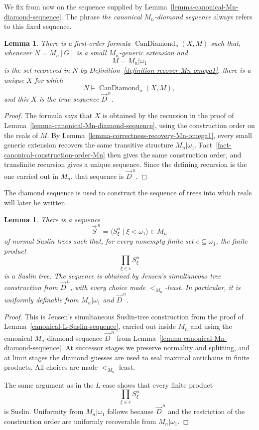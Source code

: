 \documentclass[a4paper,11pt]{article}
\newtheorem{lemma}[theorem]{Lemma}
\begin{document}
We fix from now on the sequence supplied by
Lemma~\ref{lemma-canonical-Mn-diamond-sequence}.  The phrase
\emph{the canonical $M_n$-diamond sequence} always refers to this fixed
sequence.

\begin{lemma}
\label{lemma-uniform-recovery-Mn-diamond}
There is a first-order formula
$\operatorname{CanDiamond}_n(X,M)$ such that, whenever
$N=M_n[G]$ is a small $M_n$-generic extension and
\[
   M=M_n|\omega_1
\]
is the set recovered in $N$ by
Definition~\ref{definition-recover-Mn-omega1}, there is a unique $X$ for
which
\[
   N\models\operatorname{CanDiamond}_n(X,M),
\]
and this $X$ is the true sequence $\vec D^{\,n}$.
\end{lemma}

\begin{proof}
The formula says that $X$ is obtained by the recursion in the proof of
Lemma~\ref{lemma-canonical-Mn-diamond-sequence}, using the construction order
on the reals of $M$.  By
Lemma~\ref{lemma-correctness-recovery-Mn-omega1}, every small generic
extension recovers the same transitive structure
$M_n|\omega_1$.  Fact~\ref{fact-canonical-construction-order-Mn}
then gives the same construction order, and transfinite recursion gives a
unique sequence.  Since the defining recursion is the one carried out in
$M_n$, that sequence is $\vec D^{\,n}$.
\end{proof}

The diamond sequence is used to construct the sequence of trees into which
reals will later be written.

\begin{lemma}
\label{lemma-canonical-independent-Mn-Suslin-sequence}
There is a sequence
\[
   \vec S^{\,n}
   =\langle S^n_\xi\mid\xi<\omega_1\rangle\in M_n
\]
of normal Suslin trees such that, for every nonempty finite set
$e\subseteq\omega_1$, the finite product
\[
   \prod_{\xi\in e}S^n_\xi
\]
is a Suslin tree.  The sequence is obtained by Jensen's simultaneous tree
construction from $\vec D^{\,n}$, with every choice made $<_{M_n}$-least.
In particular, it is uniformly definable from
$M_n|\omega_1$ and $\vec D^{\,n}$.
\end{lemma}

\begin{proof}
This is Jensen's simultaneous Suslin-tree construction from the proof of
Lemma~\ref{canonical-L-Suslin-sequence}, carried out inside $M_n$ and using
the canonical $M_n$-diamond sequence $\vec D^{\,n}$ from
Lemma~\ref{lemma-canonical-Mn-diamond-sequence}.  At successor stages we
preserve normality and splitting, and at limit stages the diamond guesses are
used to seal maximal antichains in finite products.  All choices are made
$<_{M_n}$-least.

The same argument as in the $L$-case shows that every finite product
\[
   \prod_{\xi\in e}S^n_\xi
\]
is Suslin.  Uniformity from $M_n|\omega_1$ follows because $\vec D^{\,n}$ and
the restriction of the construction order are uniformly recoverable from
$M_n|\omega_1$.
\end{proof}
\end{document}
